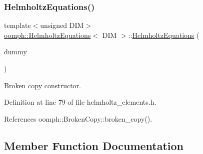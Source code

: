 \mbox{\label{classoomph_1_1HelmholtzEquations_a938188bb8d574804293e70aa62c1c8b7}} 
\subsubsection{\texorpdfstring{Helmholtz\+Equations()}{HelmholtzEquations()}\hspace{0.1cm}{\footnotesize\ttfamily [2/2]}}
{\footnotesize\ttfamily template$<$unsigned D\+IM$>$ \\
\hyperlink{classoomph_1_1HelmholtzEquations}{oomph\+::\+Helmholtz\+Equations}$<$ D\+IM $>$\+::\hyperlink{classoomph_1_1HelmholtzEquations}{Helmholtz\+Equations} (\begin{DoxyParamCaption}\item[{const \hyperlink{classoomph_1_1HelmholtzEquations}{Helmholtz\+Equations}$<$ D\+IM $>$ \&}]{dummy }\end{DoxyParamCaption})\hspace{0.3cm}{\ttfamily [inline]}}



Broken copy constructor. 



Definition at line 79 of file helmholtz\+\_\+elements.\+h.



References oomph\+::\+Broken\+Copy\+::broken\+\_\+copy().



\subsection{Member Function Documentation}
\mbox{\label{classoomph_1_1HelmholtzEquations_a962321f7f6f5925e8f108b5d48f98da2}} 
